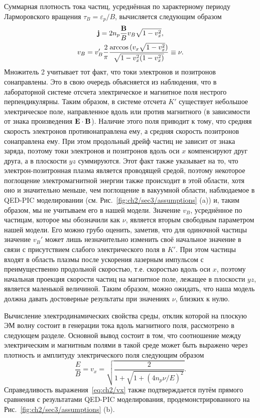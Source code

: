 Суммарная плотность тока частиц, усреднённая по характерному периоду Ларморовского вращения $\tau_B = \varepsilon_p/B$, вычисляется следующим образом
\begin{gather}
    \label{eq:ch2/j}
    \vb{j} = 2 n_p \frac{\vb B}{B} v_B \sqrt{1-v_x^2}, \\
    v_B = v_B' \frac{2}{\pi}\frac{\arccos{(v_x\sqrt{1-v_x^2})}}{\sqrt{1-v_x^2(1-v_x^2)}}\equiv \nu.
\end{gather}
Множитель 2 учитывает тот факт, что токи электронов и позитронов сонаправлены.
Это в свою очередь объясняется из наблюдения, что в лабораторной системе отсчета электрическое и магнитное поля нестрого перпендикулярны.
Таким образом, в системе отсчета $K'$ существует небольшое электрическое поле, направленное вдоль или против магнитного (в зависимости от знака произведения $\vb{E\cdot B}$).
Наличие этого поля приводит к тому, что средняя скорость электронов противонаправлена ему, а средняя скорость позитронов сонаправлена ему.
При этом продольный дрейф частиц не зависит от знака заряда, поэтому токи электронов и позитронов вдоль оси $x$ компенсируют друг друга, а в плоскости $yz$ суммируются.
Этот факт также указывает на то, что электрон-позитронная плазма является проводящей средой, поэтому некоторое поглощение электромагнитной энергии также происходит в этой области, хотя оно и значительно меньше, чем поглощение в вакуумной области, наблюдаемое в QED-PIC моделировании  (см. Рис.~\ref{fig:ch2/sec3/assumptions} (a)) и, таким образом, мы не учитываем его в нашей модели.
Значение $v_B$, усреднённое по частицам, которое мы обозначили как $\nu$, является вторым свободным параметром нашей модели.
Его можно грубо оценить, заметив, что для одиночной частицы значение $v_B'$ может лишь незначительно изменить своё начальное значение в связи с присутствием слабого электрического поля в $K'$.
При этом частицы входят в область плазмы после ускорения лазерным импульсом с преимущественно продольной скоростью, т.е. скоростью вдоль оси $x$, поэтому начальная проекция скорости частиц на магнитное поле, лежащее в плоскости $yz$, является маленькой величиной.
Таким образом, можно ожидать, что наша модель должна давать достоверные результаты при значениях $\nu$, близких к нулю.

Вычисление электродинамических свойства среды, отклик которой на плоскую ЭМ волну состоит в генерации тока вдоль магнитного поля, рассмотрено в следующем разделе. 
Основной вывод состоит в том, что соотношение между электрическим и магнитным полями в такой среде может быть выражено через плотность и амплитуду электрического поля следующим образом
 \begin{equation}
    \label{eq:ch2/vx}
     \frac{E}{B}=v_x=\sqrt{\frac{2}{1+\sqrt{1+\left(4n_p\nu/E \right)^2}}} .
 \end{equation}
Справедливость выражения~\eqref{eq:ch2/vx} также подтверждается путём прямого сравнения с результатами QED-PIC моделирования, продемонстрированного на Рис.~\ref{fig:ch2/sec3/assumptions} (b).


